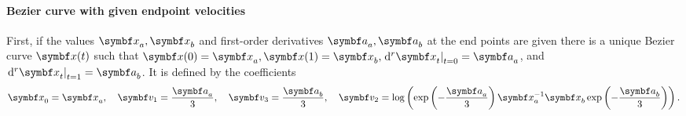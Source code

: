 \paragraph{Bezier curve with given endpoint velocities} First, if the values $\x_{a}, \x_{b}$ and first-order derivatives $\a_a, \a_{b}$ at the end points are given there is a unique Bezier curve $\x(t)$ such that $\x(0) = \x_{a}, \x(1) = \x_{b}, \left. \mathrm{d}^{r} \x_{t} \right|_{t = 0} = \a_{a}$, and $\left. \mathrm{d}^{r} \x_{t} \right|_{t = 1} = \a_{b}$. It is defined by the coefficients
\begin{equation}
  \x_{0}  = \x_{a}, \quad
  \symbf v_{1} = \frac{\a_{a}}{3}, \quad  \symbf v_{3} = \frac{\a_{b}}{3}, \quad  \symbf v_{2} = \log \left( \exp \left( -\frac{\a_{a}}{3} \right) \x_{a}^{-1} \x_{b} \exp \left( -\frac{\a_{b}}{3} \right ) \right).
\end{equation}

